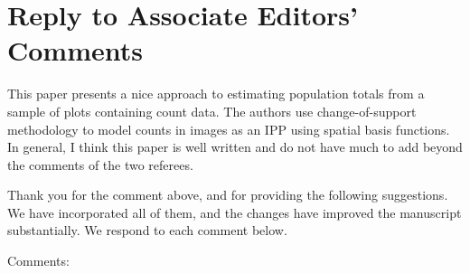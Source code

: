 \documentclass[12pt, titlepage]{article}
\begin{document}

\section{Reply to Associate Editors' Comments}

{\color{red!70!black}This paper presents a nice approach to estimating population totals from a sample of plots containing count data.  The authors use change-of-support methodology to model counts in images as an IPP using spatial basis functions.  In general, I think this paper is well written and do not have much to add beyond the comments of the two referees.}

Thank you for the comment above, and for providing the following suggestions.  We have incorporated all of them, and the changes have improved the manuscript substantially.  We respond to each comment below.

\vspace{.5cm}
{\color{red!70!black} \noindent \Large Comments:}
\end{document}

